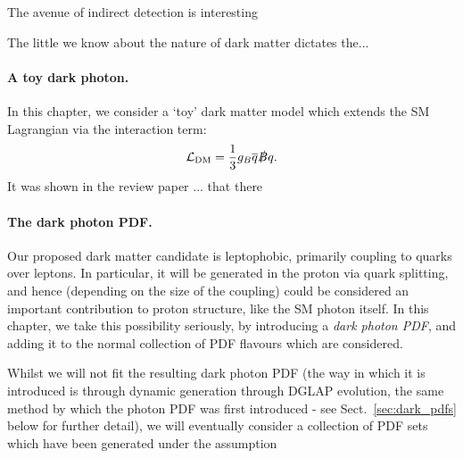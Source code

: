 \documentclass[withindex,glossary]{cam-thesis}
\begin{document}
The avenue of indirect detection is interesting 

The little we know about the nature of dark matter dictates the...


\paragraph{A toy dark photon.} In this chapter, we consider a `toy' dark matter model which extends the SM Lagrangian via the interaction term:
\begin{equation}
\label{eq:dm_lagrangian}
\mathcal{L}_{\text{DM}} = \frac{1}{3}g_B \overline{q} \slashed{B} q.
\end{equation}
It was shown in the review paper ... that there


\paragraph{The dark photon PDF.} Our proposed dark matter candidate is leptophobic, primarily coupling to quarks over leptons. In particular, it will be generated in the proton via quark splitting, and hence (depending on the size of the coupling) could be considered an important contribution to proton structure, like the SM photon itself. In this chapter, we take this possibility seriously, by introducing a \textit{dark photon PDF}, and adding it to the normal collection of PDF flavours which are considered. 

Whilst we will not fit the resulting dark photon PDF (the way in which it is introduced is through dynamic generation through DGLAP evolution, the same method by which the photon PDF was first introduced - see Sect.~\ref{sec:dark_pdfs} below for further detail), we will eventually consider a collection of PDF sets which have been generated under the assumption 
\end{document}
